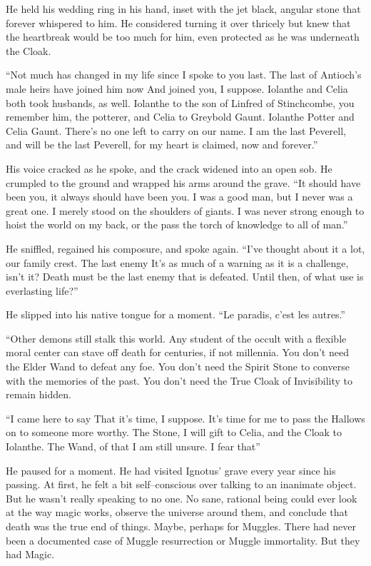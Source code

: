 He held his wedding ring in his hand, inset with the jet black, angular stone that forever whispered to him. He considered turning it over thricely but knew that the heartbreak would be too much for him, even protected as he was underneath the Cloak.

“Not much has changed in my life since I spoke to you last. The last of Antioch’s male heirs have joined him now{\el} And joined you, I suppose. Iolanthe and Celia both took husbands, as well. Iolanthe to the son of Linfred of Stinchcombe, you remember him, the potterer, and Celia to Greybold Gaunt. Iolanthe Potter and Celia Gaunt. There’s no one left to carry on our name. I am the last Peverell, and will be the last Peverell, for my heart is claimed, now and forever.”

His voice cracked as he spoke, and the crack widened into an open sob. He crumpled to the ground and wrapped his arms around the grave. “It should have been you, it always should have been you. I was a good man, but I never was a great one. I merely stood on the shoulders of giants. I was never strong enough to hoist the world on my back, or the pass the torch of knowledge to all of man.”

He sniffled, regained his composure, and spoke again. “I’ve thought about it a lot, our family crest. The last enemy{\el} It’s as much of a warning as it is a challenge, isn’t it? Death must be the last enemy that is defeated. Until then, of what use is everlasting life?”

He slipped into his native tongue for a moment. “Le paradis, c’est les autres.”

“Other demons still stalk this world. Any student of the occult with a flexible moral center can stave off death for centuries, if not millennia. You don’t need the Elder Wand to defeat any foe. You don’t need the Spirit Stone to converse with the memories of the past. You don’t need the True Cloak of Invisibility to remain hidden.

“I came here to say{\el} That it’s time, I suppose. It’s time for me to pass the Hallows on to someone more worthy. The Stone, I will gift to Celia, and the Cloak to Iolanthe. The Wand, of that I am still unsure. I fear that{\el}”

He paused for a moment. He had visited Ignotus’ grave every year since his passing. At first, he felt a bit self\mbox{--}conscious over talking to an inanimate object. But he wasn’t really speaking to no one. No sane, rational being could ever look at the way magic works, observe the universe around them, and conclude that death was the true end of things. Maybe, perhaps for Muggles. There had never been a documented case of Muggle resurrection or Muggle immortality. But they had Magic.

